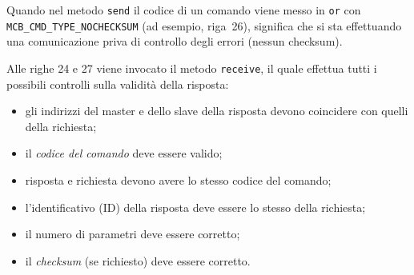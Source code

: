 Quando nel metodo \texttt{send} il codice di un comando viene messo in \texttt{or} con 
\texttt{MCB\_CMD\_TYPE\_NOCHECKSUM} (ad esempio, riga~26), significa che si sta effettuando
una comunicazione priva di controllo degli errori (nessun checksum).

Alle righe 24 e 27 viene invocato il metodo \texttt{receive}, il quale effettua tutti i 
possibili controlli sulla validit\`a della risposta:
\begin{itemize}
\item gli indirizzi del master e dello slave della risposta devono coincidere con quelli della
richiesta;
\item il \emph{codice del comando} deve essere valido;
\item risposta e richiesta devono avere lo stesso codice del comando;
\item l'identificativo (ID) della risposta deve essere lo stesso della richiesta;
\item il numero di parametri deve essere corretto;
\item il \emph{checksum} (se richiesto) deve essere corretto.
\end{itemize}
